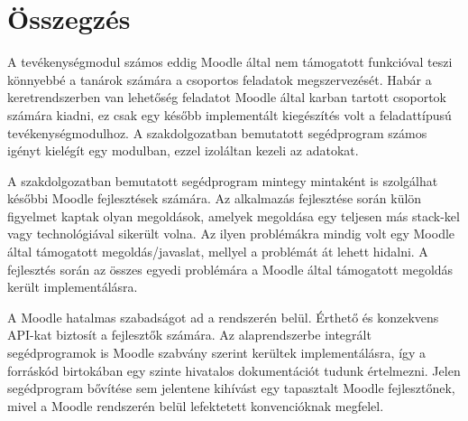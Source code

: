 \chapter{Összegzés}
\label{ch:sum}

A tevékenységmodul számos eddig Moodle által nem támogatott funkcióval teszi könnyebbé a tanárok számára a csoportos feladatok megszervezését. Habár a keretrendszerben van lehetőség feladatot Moodle által karban tartott csoportok számára kiadni, ez csak egy később implementált kiegészítés volt a feladattípusú tevékenységmodulhoz. A szakdolgozatban bemutatott segédprogram számos igényt kielégít egy modulban, ezzel izoláltan kezeli az adatokat.

A szakdolgozatban bemutatott segédprogram mintegy mintaként is szolgálhat későbbi Moodle fejlesztések számára. Az alkalmazás fejlesztése során külön figyelmet kaptak olyan megoldások, amelyek megoldása egy teljesen más stack-kel vagy technológiával sikerült volna. Az ilyen problémákra mindig volt egy Moodle által támogatott megoldás/javaslat, mellyel a problémát át lehett hidalni. A fejlesztés során az összes egyedi problémára a Moodle által támogatott megoldás került implementálásra.

A Moodle hatalmas szabadságot ad a rendszerén belül. Érthető és konzekvens API-kat biztosít a fejlesztők számára. Az alaprendszerbe integrált segédprogramok is Moodle szabvány szerint kerültek implementálásra, így a forráskód birtokában egy szinte hivatalos dokumentációt tudunk értelmezni. Jelen segédprogram bővítése sem jelentene kihívást egy tapasztalt Moodle fejlesztőnek, mivel a Moodle rendszerén belül lefektetett konvencióknak megfelel.
